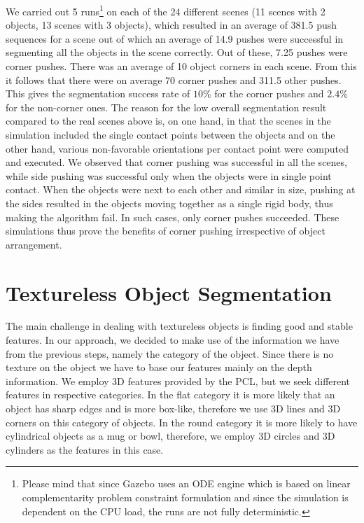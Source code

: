 We carried out 5 runs\footnote{Please mind that since Gazebo uses an ODE engine 
which is based on linear complementarity problem constraint formulation and since the
simulation is dependent on the CPU load, the runs are not fully deterministic.} 
on each of the 24 different  scenes (11 scenes  with 2
objects, 13  scenes with  3 objects), which resulted in an average  of 381.5
push sequences for a scene out of which an average of 14.9 pushes were
successful in segmenting  all the objects in the  scene correctly. Out
of these, 7.25  pushes were corner pushes. There was an average  of 10
object corners in each scene. From this it follows that there were on average
70 corner pushes and 311.5 other pushes. This gives the segmentation success rate of $10\%$
for the corner pushes and $2.4\%$ for the non-corner ones. The reason for the low
overall segmentation result compared to the real scenes above is, on one hand, in that the scenes in the simulation
included the single contact points between the objects and on the other hand, various non-favorable orientations per contact point were computed and executed.
We observed  that corner pushing was successful  in all  the scenes, while  side pushing  was successful
only  when  the  objects were in single point contact. 
When the  objects were next to each other  and similar in size,
pushing  at the sides  resulted in  the objects  moving together  as a
single rigid body, thus making the algorithm fail. In such cases, only
corner  pushes succeeded.  These simulations  thus prove the benefits of
corner pushing irrespective of object arrangement.



\section{Textureless Object Segmentation}
\label{sec:textureless}

The main challenge in dealing with textureless objects is finding good and stable features. In our approach, we decided to make use of the information we have from the previous steps, namely the category of the object. Since there is no texture on the object we have to base our features mainly on the depth information. We employ 3D features provided by the PCL, but we seek different features in respective categories. In the flat category it is more likely that an object has sharp edges and is more box-like, therefore we use 3D lines and 3D corners on this category of objects. In the round category it is more likely to have cylindrical objects as a mug or bowl, therefore, we employ 3D circles and 3D cylinders as the features in this case.

